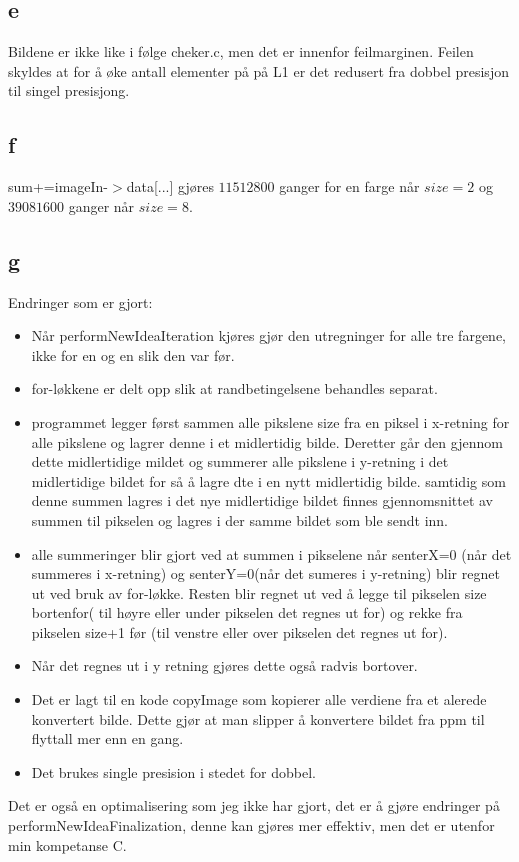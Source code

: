 \documentclass[12pt, a4paper]{article} %
\begin{document}
\subsection*{e}
Bildene er ikke like i følge cheker.c, men det er innenfor feilmarginen. Feilen skyldes at for å øke antall elementer på på L1 er det redusert fra dobbel presisjon til singel presisjong.

\subsection*{f}
sum+=imageIn-$>$data[...] gjøres $11512800 $ ganger for en farge når $size=2$ og $39081600 $ ganger når $size=8$.

\subsection*{g}
Endringer som er gjort:
\begin{itemize}
\item Når performNewIdeaIteration kjøres gjør den utregninger for alle tre fargene, ikke for en og en slik den var før.
\item for-løkkene er delt opp slik at randbetingelsene behandles separat.
\item programmet legger først sammen alle pikslene size fra en piksel i x-retning for alle pikslene og lagrer denne i et midlertidig bilde. Deretter går den gjennom dette midlertidige mildet og summerer alle pikslene i y-retning i det midlertidige bildet for så å lagre dte i en nytt midlertidig bilde. samtidig som denne summen lagres i det nye midlertidige bildet finnes gjennomsnittet av summen til pikselen og lagres i der samme bildet som ble sendt inn. 
\item alle summeringer blir gjort ved at summen i pikselene når senterX=0 (når det summeres i x-retning) og senterY=0(når det sumeres i y-retning) blir regnet ut ved bruk av for-løkke. Resten blir regnet ut ved å legge til pikselen size bortenfor( til høyre eller under pikselen det regnes ut for) og rekke fra pikselen size+1 før (til venstre eller over pikselen det regnes ut for).
\item Når det regnes ut i y retning gjøres dette også radvis bortover. 
\item Det er lagt til en kode copyImage som kopierer alle verdiene fra et alerede konvertert bilde. Dette gjør at man slipper å konvertere bildet fra ppm til flyttall mer enn en gang.
\item Det brukes single presision i stedet for dobbel. 
\end{itemize}

Det er også en optimalisering som jeg ikke har gjort, det er å gjøre endringer på performNewIdeaFinalization, denne kan gjøres mer effektiv, men det er utenfor min kompetanse  C.
\end{document}
